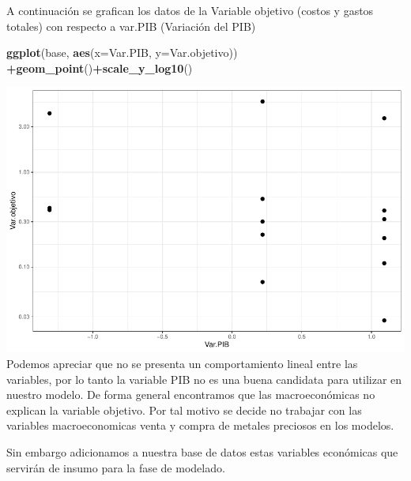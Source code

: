 \documentclass[
  11pt,
  a4paper,
]{book}
\newenvironment{Shaded}{\begin{snugshade}}{\end{snugshade}}
\newcommand{\DataTypeTok}[1]{\textcolor[rgb]{0.13,0.29,0.53}{#1}}
\newcommand{\KeywordTok}[1]{\textcolor[rgb]{0.13,0.29,0.53}{\textbf{#1}}}
\newcommand{\NormalTok}[1]{#1}
\newcommand{\OperatorTok}[1]{\textcolor[rgb]{0.81,0.36,0.00}{\textbf{#1}}}
\begin{document}
A continuación se grafican los datos de la Variable objetivo (costos y
gastos totales) con respecto a var.PIB (Variación del PIB)

\begin{Shaded}
\begin{Highlighting}[]
\KeywordTok{ggplot}\NormalTok{(base, }\KeywordTok{aes}\NormalTok{(}\DataTypeTok{x=}\NormalTok{Var.PIB, }\DataTypeTok{y=}\NormalTok{Var.objetivo)) }\OperatorTok{+}\KeywordTok{geom_point}\NormalTok{()}\OperatorTok{+}\KeywordTok{scale_y_log10}\NormalTok{()}
\end{Highlighting}
\end{Shaded}

\includegraphics{index_files/figure-latex/unnamed-chunk-62-1.pdf}
Podemos apreciar que no se presenta un comportamiento lineal entre las
variables, por lo tanto la variable PIB no es una buena candidata para
utilizar en nuestro modelo. De forma general encontramos que las
macroeconómicas no explican la variable objetivo. Por tal motivo se
decide no trabajar con las variables macroeconomicas venta y compra de
metales preciosos en los modelos.

Sin embargo adicionamos a nuestra base de datos estas variables
económicas que servirán de insumo para la fase de modelado.
\end{document}
